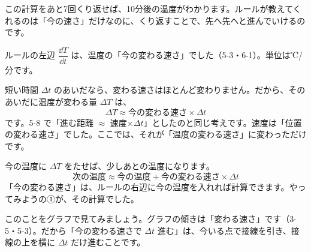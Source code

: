 この計算をあと7回くり返せば、10分後の温度がわかります。ルールが教えてくれるのは「今の速さ」だけなのに、くり返すことで、先へ先へと進んでいけるのです。

\begin{omoidasou}
\end{omoidasou}



\leavevmode\label{bk:6-2:ippo}ルールの左辺 $\dfrac{\dd T}{\dd t}$ は、温度の「今の変わる速さ」でした（5-3・6-1）。単位は℃/分です。

短い時間 $\Delta t$ のあいだなら、変わる速さはほとんど変わりません。だから、そのあいだに温度が変わる量 $\Delta T$ は、
\[ \Delta T\approx\text{今の変わる速さ}\times\Delta t \]
です。5-8 で「進む距離 $\approx$ 速度×$\Delta t$」としたのと同じ考えです。速度は「位置の変わる速さ」でした。ここでは、それが「温度の変わる速さ」に変わっただけです。

今の温度に $\Delta T$ をたせば、少しあとの温度になります。
\[ \text{次の温度}\approx\text{今の温度}+\text{今の変わる速さ}\times\Delta t \]
「今の変わる速さ」は、ルールの右辺に今の温度を入れれば計算できます。やってみようの①が、その計算でした。

このことをグラフで見てみましょう。グラフの傾きは「変わる速さ」です（3-5・5-3）。だから「今の変わる速さで $\Delta t$ 進む」は、今いる点で接線を引き、接線の上を横に $\Delta t$ だけ進むことです。

